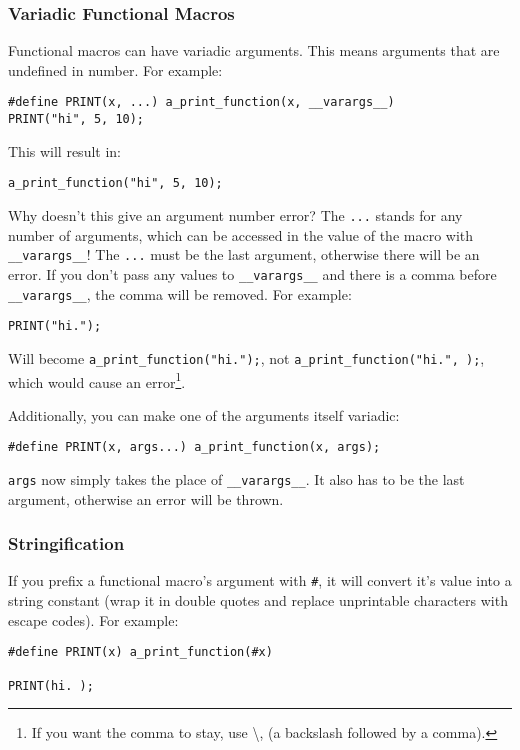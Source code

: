 \documentclass[10pt,a4paper]{article}
\begin{document}
\subsubsection{Variadic Functional Macros}

Functional macros can have variadic arguments. This means arguments that are undefined in number. For example:
\begin{verbatim}
#define PRINT(x, ...) a_print_function(x, __varargs__)
PRINT("hi", 5, 10);
\end{verbatim}

This will result in:
\begin{verbatim}
a_print_function("hi", 5, 10);
\end{verbatim}

Why doesn't this give an argument number error? The \verb|...| stands for any number of arguments, which can be accessed in the value of the macro with \verb|__varargs__|! The \verb|...| must be the last argument, otherwise there will be an error. If you don't pass any values to \verb|__varargs__| and there is a comma before \verb|__varargs__|, the comma will be removed. For example:
\begin{verbatim}
PRINT("hi.");
\end{verbatim}

Will become \verb|a_print_function("hi.");|, not \verb|a_print_function("hi.", );|, which would cause an error\footnote{If you want the comma to stay, use \textbackslash, (a backslash followed by a comma).}.

Additionally, you can make one of the arguments itself variadic:
\begin{verbatim}
#define PRINT(x, args...) a_print_function(x, args);
\end{verbatim}

\verb|args| now simply takes the place of \verb|__varargs__|. It also has to be the last argument, otherwise an error will be thrown.

\newpage




\subsubsection{Stringification}
If you prefix a functional macro's argument with \verb|#|, it will convert it's value into a string constant (wrap it in double quotes and replace unprintable characters with escape codes). For example:
\begin{verbatim}
#define PRINT(x) a_print_function(#x)

PRINT(hi. );
\end{verbatim}
\end{document}
